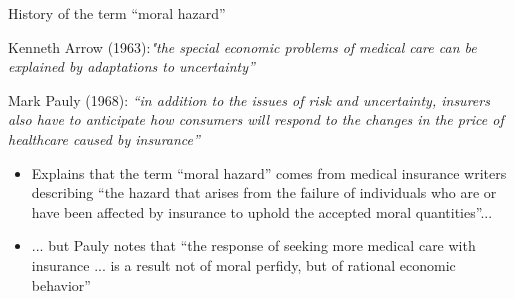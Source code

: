 \begin{frame}{History of the term ``moral hazard''}

    Kenneth Arrow (1963):\textit{"the special economic problems of medical care can be explained by adaptations to uncertainty''}\\
    \vspace{2mm}

    Mark Pauly (1968): \textit{``in addition to the issues of risk and uncertainty,
    insurers also have to anticipate how consumers will respond to
    the changes in the price of healthcare caused by insurance''}
    \begin{itemize}
        \item Explains that the term ``moral hazard'' comes from medical insurance writers describing
        ``the hazard that arises from the failure of individuals
        who are or have been affected by insurance to uphold the accepted moral quantities''...
        \item ... but Pauly notes that ``the response of seeking more medical care with insurance ...
        is a result not of moral perfidy, but of rational economic behavior''
    \end{itemize}
    
\end{frame}
